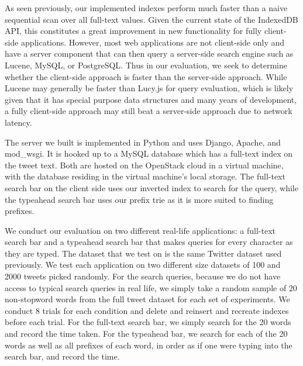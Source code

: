 \documentclass{vldb}
\begin{document}
As seen previously, our implemented indexes perform much faster than a naive sequential scan over all full-text values. Given the current state of the IndexedDB API, this constitutes a great improvement in new functionality for fully client-side applications. However, most web applications are not client-side only and have a server component that can then query a server-side search engine such as Lucene, MySQL, or PostgreSQL. Thus in our evaluation, we seek to determine whether the client-side approach is faster than the server-side approach. While Lucene may generally be faster than Lucy.js for query evaluation, which is likely given that it has special purpose data structures and many years of development, a fully client-side approach may still beat a server-side approach due to network latency. 

The server we built is implemented in Python and uses Django, Apache, and mod\_wsgi. It is hooked up to a MySQL database which has a full-text index on the tweet text. Both are hosted on the OpenStack cloud in a virtual machine, with the database residing in the virtual machine's local storage. The full-text search bar on the client side uses our inverted index to search for the query, while the typeahead search bar uses our prefix trie as it is more suited to finding prefixes.

We conduct our evaluation on two different real-life applications: a full-text search bar and a typeahead search bar that makes queries for every character as they are typed. The dataset that we test on is the same Twitter dataset used previously. We test each application on two different size datasets of 100 and 2000 tweets picked randomly. For the search queries, because we do not have access to typical search queries in real life, we simply take a random sample of 20 non-stopword words from the full tweet dataset for each set of experiments. We conduct 8 trials for each condition and delete and reinsert and recreate indexes before each trial. For the full-text search bar, we simply search for the 20 words and record the time taken. For the typeahead bar, we search for each of the 20 words as well as all prefixes of each word, in order as if one were typing into the search bar, and record the time. 
\end{document}
